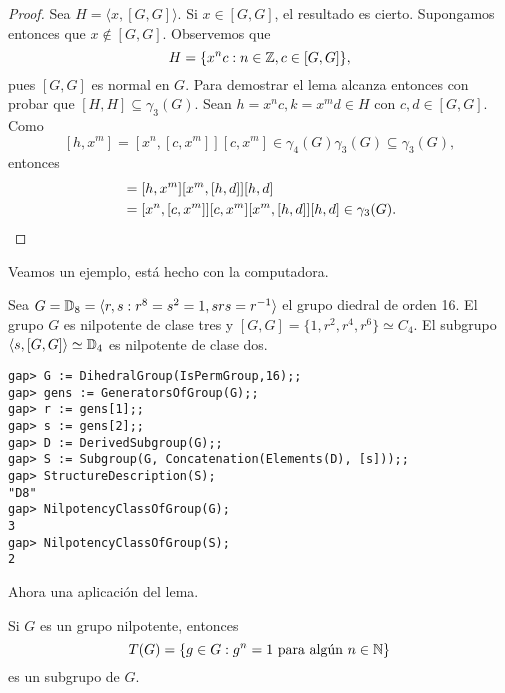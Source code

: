 \begin{proof}
	Sea $H=\langle x,[G,G]\rangle$.  Si $x\in [G,G]$, el resultado es cierto.
	Supongamos entonces que $x\not\in [G,G]$. Observemos que 
	\[
		H=\{x^nc:n\in\mathbb{Z},c\in [G,G]\},
	\]
	pues $[G,G]$ es normal en $G$. Para demostrar el lema  
	alcanza entonces con probar que $[H,H]\subseteq\gamma_3(G)$. Sean $h=x^nc,k=x^md\in H$
	con $c,d\in [G,G]$. 
	Como 
	\[
	[h,x^m]=[x^n,[c,x^m]][c,x^m]\in\gamma_4(G)\gamma_3(G)\subseteq\gamma_3(G),
	\]
	entonces 
	\begin{align*}
		[h,k]&=[h,x^m][x^m,[h,d]][h,d]\\
			&=[x^n,[c,x^m]][c,x^m][x^m,[h,d]][h,d]\in\gamma_3(G).\qedhere
	\end{align*}
\end{proof}

Veamos un ejemplo, está hecho con la computadora. 

\begin{example}
	Sea $G=\mathbb{D}_{8}=\langle r,s:r^{8}=s^2=1,srs=r^{-1}\rangle$ el grupo diedral
	de orden 16. El grupo $G$ es nilpotente de clase tres
	y $[G,G]=\{1,r^2,r^4,r^6\}\simeq C_4$. El subgrupo $\langle
	s,[G,G]\rangle\simeq\mathbb{D}_4$ es nilpotente de clase dos.

	\begin{lstlisting}
gap> G := DihedralGroup(IsPermGroup,16);;
gap> gens := GeneratorsOfGroup(G);;
gap> r := gens[1];;
gap> s := gens[2];;
gap> D := DerivedSubgroup(G);;
gap> S := Subgroup(G, Concatenation(Elements(D), [s]));;
gap> StructureDescription(S);
"D8"
gap> NilpotencyClassOfGroup(G);
3
gap> NilpotencyClassOfGroup(S);
2
	\end{lstlisting}
\end{example}

Ahora una aplicación del lema. 

\begin{theorem}
	\label{theorem:T(nilpotent)}
	Si $G$ es un grupo nilpotente, entonces
	\[
	T(G)=\{g\in G:g^n=1\text{ para algún $n\in\mathbb{N}$}\}
	\]
	es un subgrupo de $G$. 
\end{theorem}

